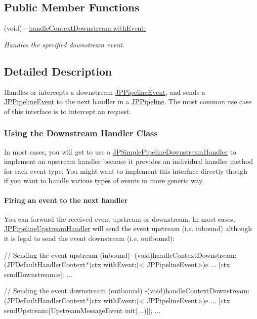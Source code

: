 \subsection*{Public Member Functions}
\begin{DoxyCompactItemize}
\item 
(void) -\/ \hyperlink{a00021_a33230f19d46ee4dfd1d200767b00ddc9}{handleContextDownstream:withEvent:}
\begin{DoxyCompactList}\small\item\em Handles the specified downstream event. \item\end{DoxyCompactList}\end{DoxyCompactItemize}


\subsection{Detailed Description}
Handles or intercepts a downstream \hyperlink{a00023}{JPPipelineEvent}, and sends a \hyperlink{a00023}{JPPipelineEvent} to the next handler in a \hyperlink{a00019}{JPPipeline}. The most common use case of this interface is to intercept an request.

\subsubsection*{Using the Downstream Handler Class}

In most cases, you will get to use a \hyperlink{a00037}{JPSimplePipelineDownstreamHandler} to implement an upstream handler because it provides an individual handler method for each event type. You might want to implement this interface directly though if you want to handle various types of events in more generic way.

\paragraph*{Firing an event to the next handler}

You can forward the received event upstream or downstream. In most cases, \hyperlink{a00035}{JPPipelineUpstreamHandler} will send the event upstream (i.e. inbound) although it is legal to send the event downstream (i.e. outbound):


\begin{DoxyCode}
 // Sending the event upstream (inbound)
 -(void)handleContextDownstream:(JPDefaultHandlerContext*)ctx withEvent:(<
      JPPipelineEvent>)e {
         ...
         [ctx sendDownstream:e];
         ...
 }
 
 // Sending the event downstream (outbound)
 -(void)handleContextDownstream:(JPDefaultHandlerContext*)ctx withEvent:(<
      JPPipelineEvent>)e {
         ...
         [ctx sendUpstream:[UpstreamMessageEvent init(...)]];
         ...
 }
\end{DoxyCode}
 

